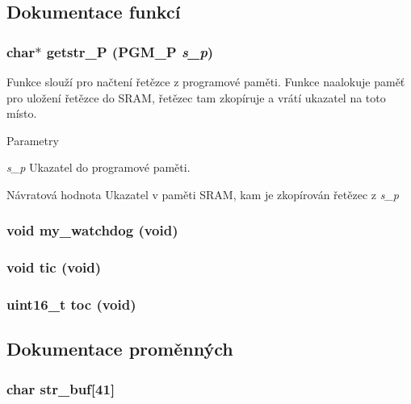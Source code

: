 \subsection{Dokumentace funkcí}
\subsubsection[{getstr\_\-P}]{\setlength{\rightskip}{0pt plus 5cm}char$\ast$ getstr\_\-P (PGM\_\-P {\em s\_\-p})}\label{main_8h_a94c5fb482b0b9ce39cae1619bf51b0ae}
Funkce slouží pro načtení řetězce z programové paměti. Funkce naalokuje paměť pro uložení řetězce do SRAM, řetězec tam zkopíruje a vrátí ukazatel na toto místo. 
\begin{DoxyParams}{Parametry}
\item[{\em s\_\-p}]Ukazatel do programové paměti. \end{DoxyParams}
\begin{DoxyReturn}{Návratová hodnota}
Ukazatel v paměti SRAM, kam je zkopírován řetězec z {\itshape s\_\-p\/} 
\end{DoxyReturn}
\subsubsection[{my\_\-watchdog}]{\setlength{\rightskip}{0pt plus 5cm}void my\_\-watchdog (void)}\label{main_8h_acf97371d95f45fa044173f164fec85f1}
\subsubsection[{tic}]{\setlength{\rightskip}{0pt plus 5cm}void tic (void)}\label{main_8h_ace51fd7d8435f88c8b2b3bcf64367673}
\subsubsection[{toc}]{\setlength{\rightskip}{0pt plus 5cm}uint16\_\-t toc (void)}\label{main_8h_a88df1dabdebb9698dcabfeb1359fa23f}


\subsection{Dokumentace proměnných}
\subsubsection[{str\_\-buf}]{\setlength{\rightskip}{0pt plus 5cm}char {\bf str\_\-buf}[41]}\label{main_8h_a7ae8aac9d74f11560f00e9f0a396b264}
